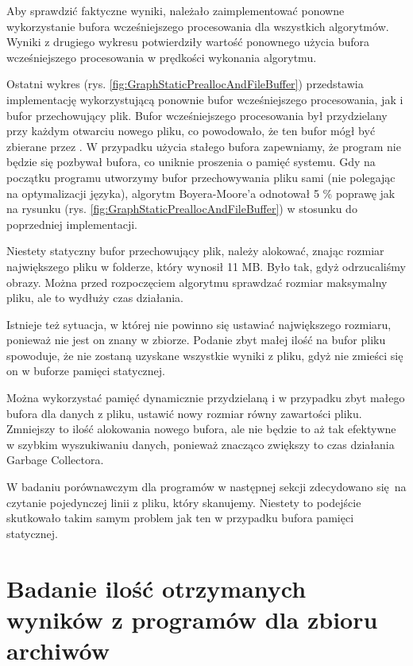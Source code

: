 Aby sprawdzić faktyczne wyniki, należało zaimplementować ponowne wykorzystanie
bufora wcześniejszego procesowania dla wszystkich algorytmów. Wyniki z drugiego wykresu 
potwierdziły wartość ponownego użycia bufora wcześniejszego procesowania w prędkości wykonania
algorytmu.

Ostatni wykres (rys. \ref{fig:GraphStaticPreallocAndFileBuffer}) przedstawia implementację
wykorzystującą ponownie bufor wcześniejszego procesowania, jak i bufor przechowujący plik.
Bufor wcześniejszego procesowania był przydzielany przy każdym otwarciu nowego pliku,
co powodowało, że ten bufor mógł być zbierane przez .
W przypadku użycia stałego bufora zapewniamy, że program nie będzie się pozbywał
bufora, co uniknie proszenia o pamięć systemu. Gdy na początku programu utworzymy
bufor przechowywania pliku sami (nie polegając na optymalizacji języka), algorytm Boyera-Moore'a
odnotował 5 \% poprawę jak na rysunku (rys. \ref{fig:GraphStaticPreallocAndFileBuffer}) w stosunku do poprzedniej implementacji.

Niestety statyczny bufor przechowujący plik, należy alokować, znając rozmiar 
największego pliku w folderze, który wynosił 11 MB. Było tak, gdyż odrzucaliśmy
obrazy. Można przed rozpoczęciem algorytmu sprawdzać rozmiar maksymalny 
pliku, ale to wydłuży czas działania.

Istnieje też sytuacja, w której nie powinno się ustawiać największego rozmiaru, ponieważ nie
jest on znany w zbiorze. Podanie zbyt małej ilość na bufor pliku spowoduje,
że nie zostaną uzyskane wszystkie wyniki z pliku, gdyż nie zmieści się on w buforze pamięci statycznej.

Można wykorzystać pamięć dynamicznie przydzielaną i w przypadku zbyt małego 
bufora dla danych z pliku, ustawić nowy rozmiar równy zawartości pliku.
Zmniejszy to ilość alokowania nowego bufora, ale nie będzie to aż tak efektywne
w szybkim wyszukiwaniu danych, ponieważ znacząco zwiększy to czas działania
Garbage Collectora.

W badaniu porównawczym dla programów w następnej sekcji zdecydowano się na
czytanie pojedynczej linii z pliku, który skanujemy. Niestety to podejście
skutkowało takim samym problem jak ten w przypadku bufora pamięci statycznej.

\section{Badanie ilość otrzymanych wyników z programów dla zbioru archiwów}

